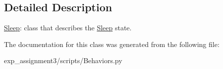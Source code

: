 \subsection{Detailed Description}
\hyperlink{classBehaviors_1_1Sleep}{Sleep}\+: class that describes the \hyperlink{classBehaviors_1_1Sleep}{Sleep} state. 

The documentation for this class was generated from the following file\+:\begin{DoxyCompactItemize}
\item 
exp\+\_\+assignment3/scripts/Behaviors.\+py\end{DoxyCompactItemize}
